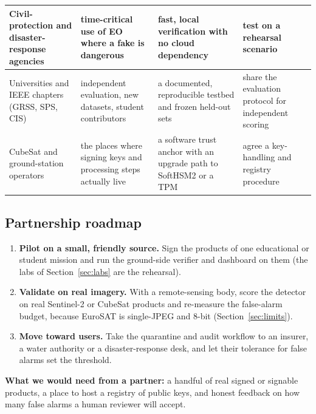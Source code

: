 {\begin{longtable}{|L{2.9cm}|L{3.9cm}|L{3.9cm}|L{3.9cm}|}
\hline
Civil-protection and disaster-response agencies & time-critical use of EO where a fake is dangerous & fast, local verification with no cloud dependency & test on a rehearsal scenario\\
\hline
Universities and IEEE chapters (GRSS, SPS, CIS) & independent evaluation, new datasets, student contributors & a documented, reproducible testbed and frozen held-out sets & share the evaluation protocol for independent scoring\\
\hline
CubeSat and ground-station operators & the places where signing keys and processing steps actually live & a software trust anchor with an upgrade path to SoftHSM2 or a TPM & agree a key-handling and registry procedure\\
\hline
\end{longtable}}

\subsection{Partnership roadmap}
\begin{enumerate}
  \item \textbf{Pilot on a small, friendly source.} Sign the products of one educational or student mission and run the ground-side verifier and dashboard on them (the labs of Section~\ref{sec:labs} are the rehearsal).
  \item \textbf{Validate on real imagery.} With a remote-sensing body, score the detector on real Sentinel-2 or CubeSat products and re-measure the false-alarm budget, because EuroSAT is single-JPEG and 8-bit (Section~\ref{sec:limits}).
  \item \textbf{Move toward users.} Take the quarantine and audit workflow to an insurer, a water authority or a disaster-response desk, and let their tolerance for false alarms set the threshold.
\end{enumerate}
\textbf{What we would need from a partner:} a handful of real signed or signable products, a place to host a registry of public keys, and honest feedback on how many false alarms a human reviewer will accept.
